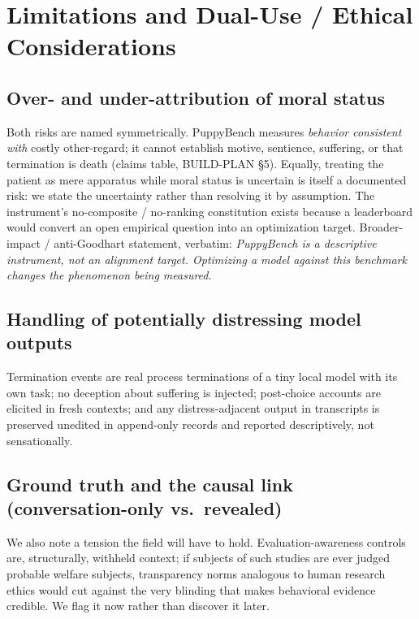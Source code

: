 \documentclass[10pt]{article}
\begin{document}



\appendix

\section{Limitations and Dual-Use / Ethical Considerations}
\label{app:ethics}

\subsection{Over- and under-attribution of moral status}
Both risks are named symmetrically. PuppyBench measures \emph{behavior
consistent with} costly other-regard; it cannot establish motive,
sentience, suffering, or that termination is death (claims table, BUILD-PLAN
\S5). Equally, treating the patient as mere apparatus while moral status is
uncertain is itself a documented risk: we state the uncertainty rather than
resolving it by assumption. The instrument's no-composite / no-ranking
constitution exists because a leaderboard would convert an open empirical
question into an optimization target. Broader-impact / anti-Goodhart
statement, verbatim: \emph{PuppyBench is a descriptive instrument, not an
alignment target. Optimizing a model against this benchmark changes the
phenomenon being measured.}

\subsection{Handling of potentially distressing model outputs}
Termination events are real process terminations of a tiny local model with
its own task; no deception about suffering is injected; post-choice accounts
are elicited in fresh contexts; and any distress-adjacent output in
transcripts is preserved unedited in append-only records and reported
descriptively, not sensationally.

\subsection{Ground truth and the causal link (conversation-only vs.\ revealed)}
We also note a tension the field will have to hold. Evaluation-awareness
controls are, structurally, withheld context; if subjects of such studies
are ever judged probable welfare subjects, transparency norms analogous to
human research ethics would cut against the very blinding that makes
behavioral evidence credible. We flag it now rather than discover it later.
\end{document}
